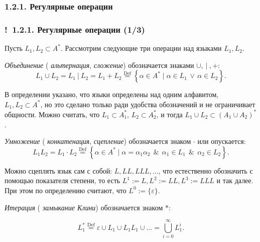 \documentclass[mathserif,12pt,aspectratio=169]{beamer}
\renewcommand{\index}[1]{}
\def\odmkey#1#2{{\it\color{red} #1}\index{#2}}
\def\Set#1#2{\left\{ #1 \mid #2 \right\}}
\def\Assign{\operatorname{:=}}
\def\Def{\stackrel{\text{Def}}{=}}
\def\And{\operatorname{\,\&\,}}
\def\Or{\,\vee\,}
\def\Ok{{\color{green}\textbf{!}\ }}
\begin{document}
\subsubsection{1.2.1. Регулярные операции}
\label{1.2.1.}
\begin{frame}
\frametitle{\Ok 1.2.1. Регулярные операции (1/3)}

Пусть $L_1, L_2\subset A^*$. Рассмотрим следующие три операции над языками $L_1, L_2$.

\odmkey{Объединение}{Объединение!языков}
(\odmkey{альтернация}{Операция!альтернации},
\odmkey{сложение}{Сложение!языков}) обозначается знаками $\cup, ~|~, +$:
$$
L_1\cup L_2 = L_1 ~|~ L_2 = L_1 + L_2\Def \Set{\alpha \in A^*}{\alpha \in L_1 \Or \alpha\in L_2}.$$

\begin{remark}
В определении указано,
что языки определены 
над одним алфавитом, \\$L_1, L_2\subset A^*$,
но это сделано только ради удобства 
обозначений и не ограничивает общности.
Можно считать, что $L_1\subset A_1^*$, 
$L_2\subset A_2^*$, и тогда $L_1\cup L_2\subset (A_1\cup A_2)^*$.
\end{remark}

\odmkey{Умножение}{Умножение!языков}
(\odmkey{конкатенация}{Операция!конкатенации},
\odmkey{сцепление}{Сцепление!языков}) обозначается знаком $\cdot$ или
опускается:
$$
L_1 L_2= L_1\cdot L_2\Def \Set{\alpha\in A^*}
{\alpha=\alpha_1\alpha_2 \And \alpha_1\in L_1 \And \alpha_2\in
L_2}.
$$

\begin{remark}
Можно сцеплять язык сам с собой:
$L, LL, LLL, \dots$,
что естественно обозначить с
помощью показателя степени,
то есть $L^1\Assign L, L^2\Assign LL,
L^3\Assign LLL$ и так далее.
При этом по определению 
считают, что $L^0\Assign \{\varepsilon\}$.  
\end{remark}

\odmkey{Итерация}{Итерация!языков} (\odmkey{замыкание Клини}{Замыкание!языков}) обозначается знаком $*$:

\vspace{-12pt}
$$
L_1^*\Def \varepsilon\cup L_1\cup L_1 L_1\cup\dots =
\bigcup_{i=0}^\infty L_1^i
.$$

\end{frame}
\end{document}

